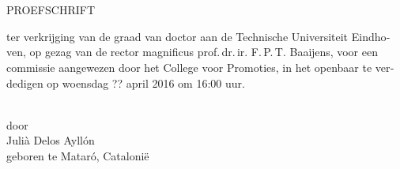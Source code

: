     \newpage%
    \thispagestyle{empty}%
    \begin{center}%
        \null{}%
        \parbox{0.85\textwidth}{%
            \centering%
            \huge%
            \ThesisTitle%
            \\\vspace{\baselineskip}%
        }
        \ifdefined\ThesisSubTitle
        \parbox{0.8\textwidth}{%
            \centering
            \large%
            \ThesisSubTitle%
        }
        \fi\\%
        \begin{otherlanguage}{dutch}%
            {PROEFSCHRIFT}\\%
            \parbox{0.75\textwidth}{%
               \centering%
                ter verkrijging van de graad van doctor aan de Technische Universiteit Eindhoven, op gezag van de rector magnificus prof.\,dr.\,ir. F.\,P.\,T. Baaijens, voor een commissie aangewezen door het College voor Promoties, in het openbaar te verdedigen op woensdag ?? april 2016 om 16:00 uur.%
            }\\%
            door\\%
            Julià Delos Ayllón\\%
            geboren te Mataró, Catalonië
       \end{otherlanguage}
    \end{center}

